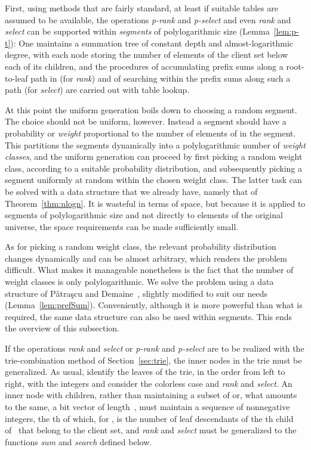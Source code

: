 \documentclass[envcountsame,envcountsect,undated,nolinenumbers]{lnthi}
\def\Tvn#1{\hbox{\textit{#1\/}}}
\begin{document}
First, using methods that are fairly standard,
at least if suitable tables are assumed to be available,
the operations \Tvn{p-rank} and \Tvn{p-select} and
even \Tvn{rank} and \Tvn{select} can be supported
within \emph{segments} of
polylogarithmic size (Lemma~\ref{lem:p-t}):
One maintains a summation tree  of constant depth
and almost-logarithmic degree, with each node storing the
number of elements of the client set  below each
of its children, and the procedures of accumulating
prefix sums along a root-to-leaf path in 
(for \Tvn{rank}) and of searching within the
prefix sums along such a path (for \Tvn{select})
are carried out with table lookup.

At this point the uniform generation boils down
to choosing a random segment.
The choice should not be uniform, however.
Instead a segment should have a probability
or \emph{weight}
proportional to the number of elements of 
in the segment.
This partitions the segments
dynamically into a polylogarithmic
number of \emph{weight classes}, and the uniform
generation can proceed by first picking a 
random weight class, according to a suitable probability
distribution, and subsequently picking a segment
uniformly at random within the chosen weight class.
The latter task can be solved with a data structure
that we already have, namely that of Theorem~\ref{thm:nlogn}.
It is wasteful in terms of space, but
because it is applied to segments of
polylogarithmic size and not directly
to elements of the original universe, the space
requirements can be made sufficiently small.

As for picking a random weight class, the relevant
probability distribution changes dynamically and
can be almost arbitrary,
which renders the problem difficult.
What makes it manageable nonetheless is the fact
that the number of weight classes is only
polylogarithmic.
We solve the problem using a data structure of
P\v atra\c scu and Demaine~\cite{PatD06},
slightly modified to suit our needs
(Lemma~\ref{lem:prefSum}).
Conveniently, although it is more powerful
than what is required, the same data structure can also
be used within segments.
This ends the overview of this subsection.

If the operations \Tvn{rank} and \Tvn{select}
or \Tvn{p-rank} and \Tvn{p-select} are to be realized
with the trie-combination method of
Section~\ref{sec:trie}, the inner nodes
in the trie must be generalized.
As usual, identify the leaves of the trie, in
the order from left to right, with the integers
 and consider the colorless case
and \Tvn{rank} and \Tvn{select}.
An inner node  with  children, rather than maintaining
a subset of  or, what amounts to
the same, a bit vector of length~, must maintain
a sequence  of  nonnegative integers, the th
of which, for , is the number of
leaf descendants of the th child of~
that belong to the client set, and \Tvn{rank}
and \Tvn{select} must be generalized to the
functions \Tvn{sum} and \Tvn{search}
defined below.
\end{document}

